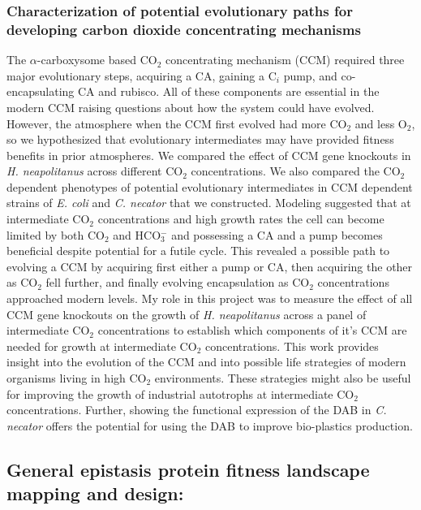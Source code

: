 \documentclass{article}
\begin{document}
\subsubsection{Characterization of potential evolutionary paths for developing carbon dioxide concentrating mechanisms} \label{CCM_EVO_COMBINED}
The $\alpha$-carboxysome based CO$_2$ concentrating mechanism (CCM) required three major evolutionary steps, acquiring a CA, gaining a C$_i$ pump, and co-encapsulating CA and rubisco.
All of these components are essential in the modern CCM raising questions about how the system could have evolved.
However, the atmosphere when the CCM first evolved had more CO$_2$ and less O$_2$, so we hypothesized that evolutionary intermediates may have provided fitness benefits in prior atmospheres.
We compared the effect of CCM gene knockouts in \textit{H. neapolitanus} across different CO$_2$ concentrations.
We also compared the CO$_2$ dependent phenotypes of potential evolutionary intermediates in CCM dependent strains of \textit{E. coli} and \textit{C. necator} that we constructed.
Modeling suggested that at intermediate CO$_2$ concentrations and high growth rates the cell can become limited by both CO$_2$ and HCO$_{3}^{-}$ and possessing a CA and a pump becomes beneficial despite potential for a futile cycle.
This revealed a possible path to evolving a CCM by acquiring first either a pump or CA, then acquiring the other as CO$_2$ fell further, and finally evolving encapsulation as CO$_2$ concentrations approached modern levels.
My role in this project was to measure the effect of all CCM gene knockouts on the growth of \textit{H. neapolitanus} across a panel of intermediate CO$_2$ concentrations to establish which components of it's CCM are needed for growth at intermediate CO$_2$ concentrations.
This work provides insight into the evolution of the CCM and into possible life strategies of modern organisms living in high CO$_2$ environments.
These strategies might also be useful for improving the growth of industrial autotrophs at intermediate CO$_2$ concentrations.
Further, showing the functional expression of the DAB in \textit{C. necator} offers the potential for using the DAB to improve bio-plastics production.

%
\nocite{Desmarais2019-yc,Desmarais2018-ac,Desmarais2019-dc,Flamholz2022-yo}
\printbibliography[heading=none]

\leavevmode\pagebreak

\subsection{General epistasis protein fitness landscape mapping and design:}
\end{document}
